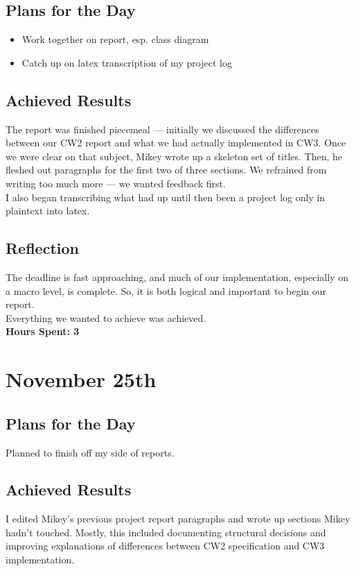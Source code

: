 \documentclass[titlepage, 12pt]{extarticle}
\begin{document}
\subsection{Plans for the Day}
\begin{itemize}
    \item Work together on report, esp. class diagram
    \item Catch up on latex transcription of my project log
\end{itemize}

\subsection{Achieved Results}
The report was finished piecemeal --- initially we discussed the differences
between our CW2 report and what we had actually implemented in CW3. Once we
were clear on that subject, Mikey wrote up a skeleton set of titles. Then, he
fleshed out paragraphs for the first two of three sections. We refrained from
writing too much more --- we wanted feedback first.\\

I also began transcribing what had up until then been a project log only in
plaintext into latex.\\

\subsection{Reflection}
The deadline is fast approaching, and much of our implementation, especially on
a macro level, is complete. So, it is both logical and important to begin our
report.\\

Everything we wanted to achieve was achieved.\\

{\bf Hours Spent: 3 }
\section{November 25th}
\subsection{Plans for the Day}
Planned to finish off my side of reports.

\subsection{Achieved Results}
I edited Mikey's previous project report paragraphs and wrote up sections Mikey
hadn't touched. Mostly, this included documenting structural decisions and
improving explanations of differences between CW2 specification and CW3
implementation.
\end{document}
